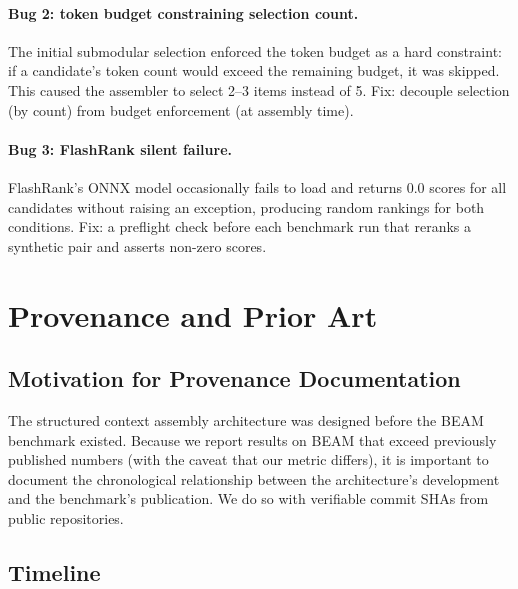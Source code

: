 \documentclass[11pt]{article}
\begin{document}
\paragraph{Bug 2: token budget constraining selection count.}
The initial submodular selection enforced the token budget as a hard
constraint: if a candidate's token count would exceed the remaining
budget, it was skipped.  This caused the assembler to select 2--3
items instead of 5.  Fix: decouple selection (by count) from budget
enforcement (at assembly time).

\paragraph{Bug 3: FlashRank silent failure.}
FlashRank's ONNX model occasionally fails to load and returns 0.0
scores for all candidates without raising an exception, producing
random rankings for both conditions.  Fix: a preflight check before
each benchmark run that reranks a synthetic pair and asserts non-zero
scores.

\section{Provenance and Prior Art}
\label{sec:provenance}

\subsection{Motivation for Provenance Documentation}

The structured context assembly architecture was designed before the
BEAM benchmark existed.  Because we report results on BEAM that
exceed previously published numbers (with the caveat that our metric
differs), it is important to document the chronological relationship
between the architecture's development and the benchmark's
publication.  We do so with verifiable commit SHAs from public
repositories.

\subsection{Timeline}
\end{document}
